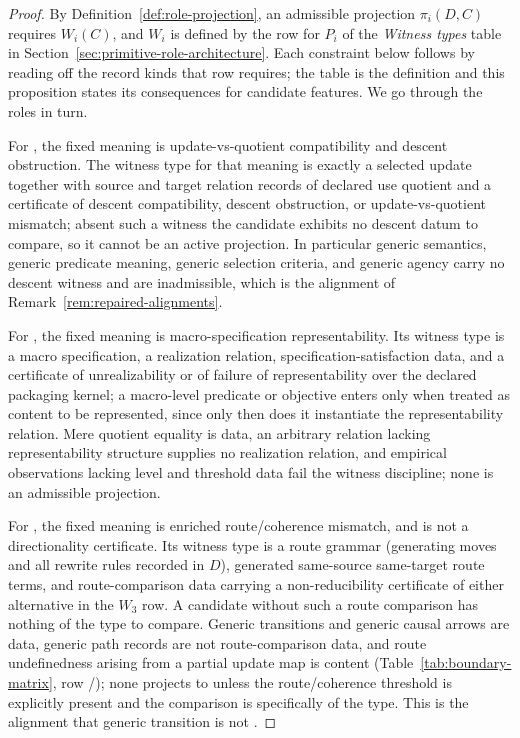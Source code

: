 \begin{proof}
By Definition~\ref{def:role-projection}, an admissible projection
\(\pi_i(D,C)\) requires \(W_i(C)\), and \(W_i\) is defined by the row for
\(P_i\) of the \emph{Witness types} table in
Section~\ref{sec:primitive-role-architecture}. Each constraint below follows
by reading off the record kinds that row requires; the table is the
definition and this proposition states its consequences for candidate
features. We go through the roles in turn.

For \Pone{}, the fixed meaning is update-vs-quotient compatibility and
descent obstruction. The witness type for that meaning is exactly a
selected update together with source and target relation records of declared use quotient and a
certificate of descent compatibility, descent obstruction, or
update-vs-quotient mismatch; absent such a witness the candidate
exhibits no descent datum to compare, so it cannot be an active \Pone{}
projection. In particular generic semantics, generic predicate meaning,
generic selection criteria, and generic agency carry no descent witness
and are inadmissible, which is the alignment of
Remark~\ref{rem:repaired-alignments}.

For \Ptwo{}, the fixed meaning is macro-specification representability.
Its witness type is a macro specification, a realization relation,
specification-satisfaction data, and a certificate of unrealizability or of
failure of representability over the declared packaging kernel; a macro-level predicate or objective
enters only when treated as content to be represented, since only then
does it instantiate the representability relation. Mere quotient
equality is \Pfive{} data, an arbitrary relation lacking
representability structure supplies no realization relation, and
empirical observations lacking level and threshold data fail the witness
discipline; none is an admissible \Ptwo{} projection.

For \Pthree{}, the fixed meaning is enriched route/coherence mismatch,
and \Pthree{} is not a directionality certificate. Its witness type is
a route grammar (generating moves and all rewrite rules recorded in \(D\)), generated same-source same-target route terms,
and route-comparison data carrying a non-reducibility certificate of either
alternative in the \(W_3\) row. A candidate without such a route
comparison has nothing of the \Pthree{} type to compare. Generic
transitions and generic causal arrows are \Pfour{} data, generic path
records are not route-comparison data, and route undefinedness arising
from a partial update map is \Pone{} content (Table~\ref{tab:boundary-matrix},
row \Pone{}/\Pthree{}); none projects to
\Pthree{} unless the route/coherence threshold is explicitly present and
the comparison is specifically of the \Pthree{} type. This is the
alignment that generic transition is not \Pthree{}.


\end{proof}
